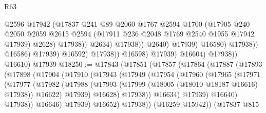 \begin{lexlean}{R63}
\begin{coremodule}
                                            @2596
                                            @17942
                                            (@17837
                                              @241
                                              @89
                                              @2060
                                              @1767
                                              @2594
                                              @1700
                                              (@17905
                                                @240
                                                @2050
                                                @2059
                                                @2615
                                                @2594
                                                (@17911 @236 @2048 @1769 @2540 @1955 @17942 @17939)
                                                @2628)
                                              @17938))
                                          @2634)
                                        @17938))
                                    @2640)
                                  @17939)
                                @16580)
                              @17938))
                          @16586)
                        @17939)
                      @16592)
                    @17938))
                @16598)
              @17939)
            @16604)
          @17938))
      @16610)
    @17939
@18250 := @17843
    (@17851
      (@17857
        (@17864
          (@17887
            (@17893
              (@17898
                (@17904
                  (@17910
                    (@17943
                      (@17949
                        (@17954
                          (@17960
                            (@17965
                              (@17971
                                (@17977
                                  (@17982
                                    (@17988
                                      (@17993
                                        (@17999 (@18005 (@18010 @18187 @16616) @17938))
                                        @16622)
                                      @17939)
                                    @16628)
                                  @17938))
                              @16634)
                            @17939)
                          @16640)
                        @17938))
                    @16646)
                  @17939)
                @16652)
              @17938))
          (@16259 @15942))
        (@17837
          @815

\end{coremodule}
\end{lexlean}
